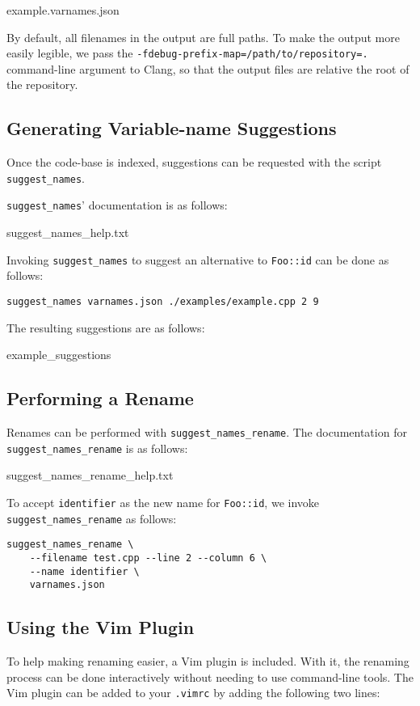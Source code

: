
		{example.varnames.json}

By default, all filenames in the output are full paths. To make the output more
easily legible, we pass the \lstinline|-fdebug-prefix-map=/path/to/repository=.|
command-line argument to Clang, so that the output files are relative the root
of the repository.

\subsection{Generating Variable-name Suggestions}
Once the code-base is indexed, suggestions can be requested with the script
\lstinline|suggest_names|.

\lstinline|suggest_names|' documentation is as follows:

	{suggest_names_help.txt}

Invoking \lstinline|suggest_names| to suggest an alternative to
\lstinline|Foo::id| can be done as follows:

\begin{lstlisting}
suggest_names varnames.json ./examples/example.cpp 2 9
\end{lstlisting}

The resulting suggestions are as follows:

		{example_suggestions}

\subsection{Performing a Rename}
Renames can be performed with \lstinline|suggest_names_rename|.
The documentation for \lstinline|suggest_names_rename| is as follows:

		{suggest_names_rename_help.txt}

To accept \lstinline|identifier| as the new name for \lstinline|Foo::id|, we
invoke \lstinline|suggest_names_rename| as follows:
\begin{lstlisting}[caption={Invocation of \lstinline|suggest_name_rename|}]
suggest_names_rename \
	--filename test.cpp --line 2 --column 6 \
	--name identifier \
	varnames.json
\end{lstlisting}

\subsection{Using the Vim Plugin}
To help making renaming easier, a Vim \cite{vim} plugin is included.
With it, the renaming process can be done interactively without needing to use
command-line tools.
The Vim plugin can be added to your \lstinline|.vimrc| by adding the following
two lines:

